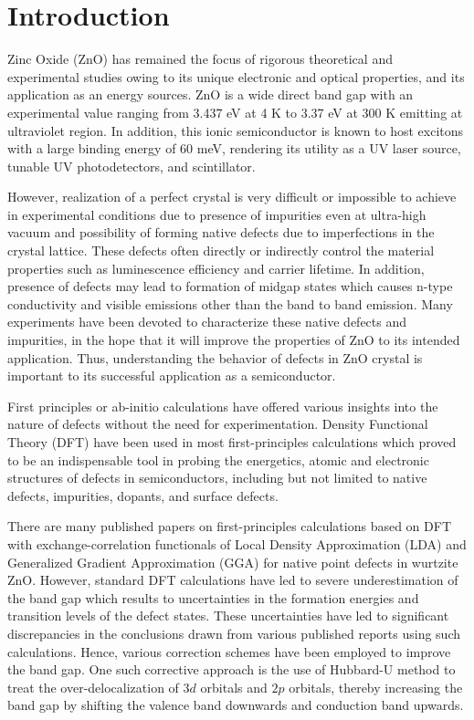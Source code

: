 \addchapheadtotoc


\chapter{Introduction}
Zinc Oxide (ZnO) has remained the focus of rigorous theoretical and experimental studies owing to its unique electronic and optical properties, and its application as an energy sources. ZnO is a wide direct band gap with an experimental value ranging from 3.437 eV at 4 K to  3.37 eV at 300 K emitting at ultraviolet region. In addition, this ionic semiconductor is known to host excitons with a large binding energy of 60 meV, rendering its utility as a UV laser source, tunable UV photodetectors, and scintillator. 

However, realization of a perfect crystal is very difficult or impossible to achieve in experimental conditions due to presence of impurities even at ultra-high vacuum and possibility of forming native defects due to imperfections in the crystal lattice.  These defects often directly or indirectly control the material properties such as luminescence efficiency and carrier lifetime.  In addition, presence of defects may lead to formation of midgap states which causes n-type conductivity and  visible emissions other than the band to band emission. Many experiments have been devoted to characterize these native defects and impurities, in the hope that it will improve the properties of ZnO to its intended application. Thus, understanding the behavior of defects in ZnO crystal is important to its successful application as a semiconductor.  

First principles or ab-initio calculations have offered various insights into the nature of defects without the need for experimentation. Density Functional Theory (DFT) have been used in most first-principles calculations which proved to be an indispensable tool in probing the energetics, atomic and electronic structures of defects in semiconductors, including  but not limited to native defects, impurities, dopants, and surface defects. 

There are many published papers on first-principles  calculations based on DFT with exchange-correlation functionals of Local Density Approximation (LDA) and Generalized Gradient Approximation (GGA) for native point defects in wurtzite ZnO. However, standard DFT calculations have led to severe underestimation of the  band gap which results to uncertainties in the formation energies and transition levels of the defect states.  These uncertainties have led to significant discrepancies in the conclusions drawn from various published reports using such calculations. Hence, various correction schemes have been employed to improve the band gap. One such corrective approach is the use of Hubbard-U method  to treat the over-delocalization of $3d$  orbitals and $2p$  orbitals,  thereby increasing the band gap by shifting the valence band downwards and conduction band upwards. 

